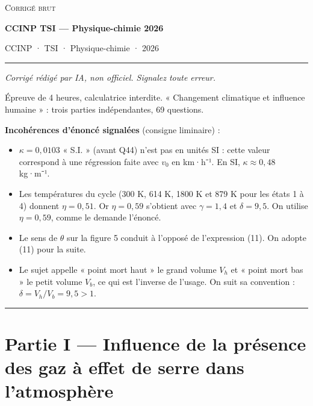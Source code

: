 \documentclass[11pt,a4paper]{article}
\providecommand{\tightlist}{\setlength{\itemsep}{0pt}\setlength{\parskip}{0pt}}
\begin{document}
\thispagestyle{plain}
\begin{center}
  {\small\scshape Corrigé brut}\par\smallskip
  {\LARGE\bfseries CCINP TSI — Physique-chimie 2026\par}\medskip
  {\large CCINP · TSI · Physique-chimie · 2026\par}
\end{center}
\vspace{2pt}\hrule\vspace{8pt}

\emph{Corrigé rédigé par IA, non officiel. Signalez toute erreur.}

Épreuve de 4 heures, calculatrice interdite. « Changement climatique et influence humaine » : trois parties indépendantes, 69 questions.

\textbf{Incohérences d'énoncé signalées} (consigne liminaire) :

\begin{itemize}
\tightlist
\item
  \(\kappa=0{,}0103\) « S.I. » (avant Q44) n'est pas en unités SI : cette valeur correspond à une régression faite avec \(v_0\) en km·h⁻¹. En SI, \(\kappa\approx0{,}48\) kg·m⁻¹.
\item
  Les températures du cycle (300 K, 614 K, 1800 K et 879 K pour les états 1 à 4) donnent \(\eta=0{,}51\). Or \(\eta=0{,}59\) s'obtient avec \(\gamma=1{,}4\) et \(\delta=9{,}5\). On utilise \(\eta=0{,}59\), comme le demande l'énoncé.
\item
  Le sens de \(\theta\) sur la figure 5 conduit à l'opposé de l'expression (11). On adopte (11) pour la suite.
\item
  Le sujet appelle « point mort haut » le grand volume \(V_h\) et « point mort bas » le petit volume \(V_b\), ce qui est l'inverse de l'usage. On suit sa convention : \(\delta=V_h/V_b=9{,}5>1\).
\end{itemize}

\begin{center}\rule{0.5\linewidth}{0.5pt}\end{center}

\hypertarget{partie-i-influence-de-la-pruxe9sence-des-gaz-uxe0-effet-de-serre-dans-latmosphuxe8re}{%
\section{Partie I --- Influence de la présence des gaz à effet de serre dans l'atmosphère}\label{partie-i-influence-de-la-pruxe9sence-des-gaz-uxe0-effet-de-serre-dans-latmosphuxe8re}}
\end{document}
